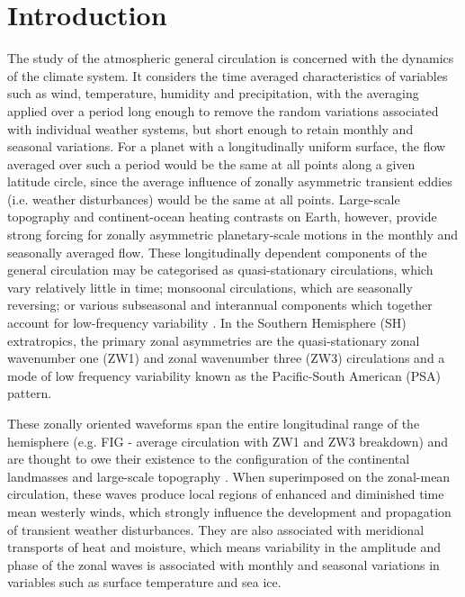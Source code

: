 
\chapter{Introduction}


The study of the atmospheric general circulation is concerned with the dynamics of the climate system. It considers the time averaged characteristics of variables such as wind, temperature, humidity and precipitation, with the averaging applied over a period long enough to remove the random variations associated with individual weather systems, but short enough to retain monthly and seasonal variations. For a planet with a longitudinally uniform surface, the flow averaged over such a period would be the same at all points along a given latitude circle, since the average influence of zonally asymmetric transient eddies (i.e. weather disturbances) would be the same at all points. Large-scale topography and continent-ocean heating contrasts on Earth, however, provide strong forcing for zonally asymmetric planetary-scale motions in the monthly and seasonally averaged flow. These longitudinally dependent components of the general circulation may be categorised as quasi-stationary circulations, which vary relatively little in time; monsoonal circulations, which are seasonally reversing; or various subseasonal and interannual components which together account for low-frequency variability \citep{Holton2013}. In the Southern Hemisphere (SH) extratropics, the primary zonal asymmetries are the quasi-stationary zonal wavenumber one (ZW1) and zonal wavenumber three (ZW3) circulations and a mode of low frequency variability known as the Pacific-South American (PSA) pattern.

These zonally oriented waveforms span the entire longitudinal range of the hemisphere (e.g. FIG - average circulation with ZW1 and ZW3 breakdown) and are thought to owe their existence to the configuration of the continental landmasses and large-scale topography \citep{Baines1989}. When superimposed on the zonal-mean circulation, these waves produce local regions of enhanced and diminished time mean westerly winds, which strongly influence the development and propagation of transient weather disturbances. They are also associated with meridional transports of heat and moisture, which means variability in the amplitude and phase of the zonal waves is associated with monthly and seasonal variations in variables such as surface temperature and sea ice. 

